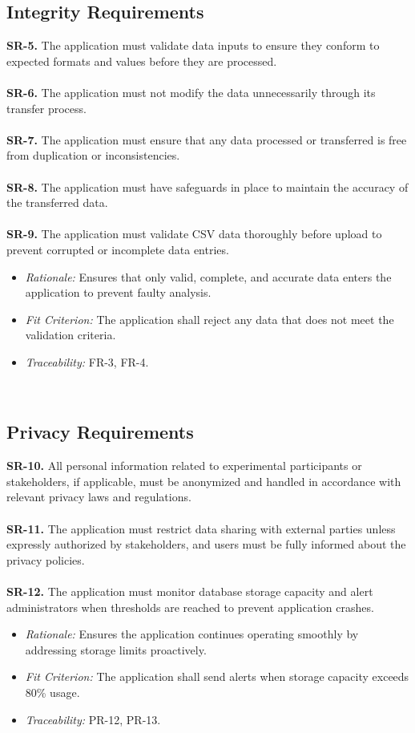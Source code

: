 \documentclass{article}
\begin{document}
\subsection{Integrity Requirements}
\textbf{SR-5.} The application must validate data inputs to ensure they conform
  to expected formats and values before they are processed. \ \\
\ \\
\textbf{SR-6.} The application must not modify the data unnecessarily through
  its transfer process. \ \\
\ \\
\textbf{SR-7.} The application must ensure that any data processed or
  transferred is free from duplication or inconsistencies. \ \\
\ \\
\textbf{SR-8.} The application must have safeguards in place to maintain the
  accuracy of the transferred data. \ \\
  \ \\
\textbf{SR-9.} The application must validate CSV data thoroughly before upload to
prevent corrupted or incomplete data entries.
  \begin{itemize}
    \item \textit{Rationale:} Ensures that only valid, complete, and accurate
    data enters the application to prevent faulty analysis.
    \item \textit{Fit Criterion:} The application shall reject any data that
    does not meet the validation criteria.
    \item \textit{Traceability:} FR-3, FR-4.
  \end{itemize}
\ \\

\subsection{Privacy Requirements}
\textbf{SR-10.} All personal information related to experimental participants or
  stakeholders, if applicable, must be anonymized and handled in accordance with
  relevant privacy laws and regulations. \ \\
\ \\
\textbf{SR-11.} The application must restrict data sharing with external parties
  unless expressly authorized by stakeholders, and users must be fully informed
  about the privacy policies. \ \\
  \ \\
  \textbf{SR-12.} The application must monitor database storage capacity and alert
  administrators when thresholds are reached to prevent application crashes.
    \begin{itemize}
      \item \textit{Rationale:} Ensures the application continues operating smoothly
      by addressing storage limits proactively.
      \item \textit{Fit Criterion:} The application shall send alerts when storage
      capacity exceeds 80\% usage.
      \item \textit{Traceability:} PR-12, PR-13.
    \end{itemize}
\end{document}
